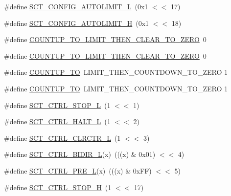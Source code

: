 \begin{DoxyCompactItemize}
\#define \hyperlink{group___s_c_t__18_x_x__43_x_x_gac727f3a2843844006cad343e832f2986}{S\+C\+T\+\_\+\+C\+O\+N\+F\+I\+G\+\_\+\+A\+U\+T\+O\+L\+I\+M\+I\+T\+\_\+L}~(0x1 $<$$<$ 17)
\item 
\#define \hyperlink{group___s_c_t__18_x_x__43_x_x_gade673779ab8ecd446b29251467328b6e}{S\+C\+T\+\_\+\+C\+O\+N\+F\+I\+G\+\_\+\+A\+U\+T\+O\+L\+I\+M\+I\+T\+\_\+H}~(0x1 $<$$<$ 18)
\item 
\#define \hyperlink{group___s_c_t__18_x_x__43_x_x_gae031b8fdb62fadf5d4a61e5d633200d6}{C\+O\+U\+N\+T\+U\+P\+\_\+\+T\+O\+\_\+\+L\+I\+M\+I\+T\+\_\+\+T\+H\+E\+N\+\_\+\+C\+L\+E\+A\+R\+\_\+\+T\+O\+\_\+\+Z\+E\+RO}~0
\item 
\#define \hyperlink{group___s_c_t__18_x_x__43_x_x_gae031b8fdb62fadf5d4a61e5d633200d6}{C\+O\+U\+N\+T\+U\+P\+\_\+\+T\+O\+\_\+\+L\+I\+M\+I\+T\+\_\+\+T\+H\+E\+N\+\_\+\+C\+L\+E\+A\+R\+\_\+\+T\+O\+\_\+\+Z\+E\+RO}~0
\item 
\#define \hyperlink{group___s_c_t__18_x_x__43_x_x_ga06ed56286d35da0efb487ae76663f40a}{C\+O\+U\+N\+T\+U\+P\+\_\+\+TO}~L\+I\+M\+I\+T\+\_\+\+T\+H\+E\+N\+\_\+\+C\+O\+U\+N\+T\+D\+O\+W\+N\+\_\+\+T\+O\+\_\+\+Z\+E\+RO 1
\item 
\#define \hyperlink{group___s_c_t__18_x_x__43_x_x_ga06ed56286d35da0efb487ae76663f40a}{C\+O\+U\+N\+T\+U\+P\+\_\+\+TO}~L\+I\+M\+I\+T\+\_\+\+T\+H\+E\+N\+\_\+\+C\+O\+U\+N\+T\+D\+O\+W\+N\+\_\+\+T\+O\+\_\+\+Z\+E\+RO 1
\item 
\#define \hyperlink{group___s_c_t__18_x_x__43_x_x_ga630d5421762974f255537a14d391b0be}{S\+C\+T\+\_\+\+C\+T\+R\+L\+\_\+\+S\+T\+O\+P\+\_\+L}~(1 $<$$<$ 1)
\item 
\#define \hyperlink{group___s_c_t__18_x_x__43_x_x_ga40704e7d46713ea4b4c84e07a80a482e}{S\+C\+T\+\_\+\+C\+T\+R\+L\+\_\+\+H\+A\+L\+T\+\_\+L}~(1 $<$$<$ 2)
\item 
\#define \hyperlink{group___s_c_t__18_x_x__43_x_x_ga75edacff186a48ac4193bf5069e03fba}{S\+C\+T\+\_\+\+C\+T\+R\+L\+\_\+\+C\+L\+R\+C\+T\+R\+\_\+L}~(1 $<$$<$ 3)
\item 
\#define \hyperlink{group___s_c_t__18_x_x__43_x_x_ga8cf518b4240ce7d11e5bf552a49f7092}{S\+C\+T\+\_\+\+C\+T\+R\+L\+\_\+\+B\+I\+D\+I\+R\+\_\+L}(x)~(((x) \& 0x01) $<$$<$ 4)
\item 
\#define \hyperlink{group___s_c_t__18_x_x__43_x_x_gac781c2ccd9053038834cebc3f0ea6ec6}{S\+C\+T\+\_\+\+C\+T\+R\+L\+\_\+\+P\+R\+E\+\_\+L}(x)~(((x) \& 0x\+F\+F) $<$$<$ 5)
\item 
\#define \hyperlink{group___s_c_t__18_x_x__43_x_x_gae0f0598ff2c22b1db06e3590c03280ea}{S\+C\+T\+\_\+\+C\+T\+R\+L\+\_\+\+S\+T\+O\+P\+\_\+H}~(1 $<$$<$ 17)

\end{DoxyCompactItemize}
